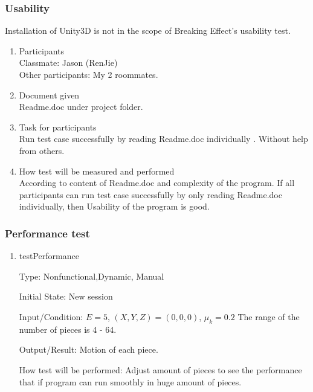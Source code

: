 \documentclass[12pt, titlepage]{article}
\begin{document}
	\subsubsection{Usability}
	
	Installation of Unity3D is not in the scope of Breaking Effect's usability test.
	
	\begin{enumerate}
		
		\item{Participants\\}
		Classmate: Jason (RenJie)\\
		Other participants: My 2 roommates. 
		
		\item{Document given\\}
		Readme.doc under project folder.
		
		\item{Task for participants\\}
		Run test case successfully by reading Readme.doc individually . Without help from
		others.
		
		\item{How test will be measured and performed\\}
		According to content of Readme.doc and complexity of the program. If all participants can run test case successfully by only reading Readme.doc individually, then Usability of the program is good.
		
	\end{enumerate}
	
	\subsubsection{Performance test}
	
	\begin{enumerate}
		
		\item{testPerformance\\}
		
		Type: Nonfunctional,Dynamic, Manual
		
		Initial State: New session
		
		Input/Condition: $E = 5$, $(X,Y,Z) = (0,0,0)$, $\mu_{k} = 0.2$ The range of the number of pieces is 4 - 64.
		
		Output/Result: Motion of each piece.
		
		How test will be performed: Adjust amount of pieces to see the performance that if program can run smoothly in huge amount of pieces.
		
	\end{enumerate}
	
\end{document}
